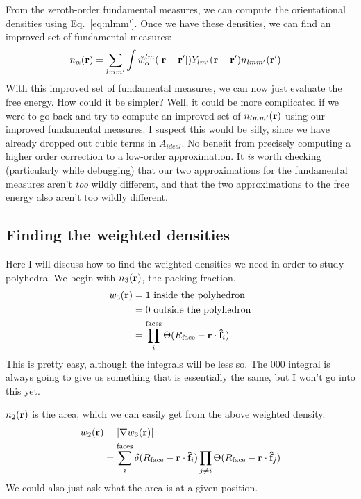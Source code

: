 \documentclass[letterpaper,twocolumn,amsmath,amssymb,pre]{revtex4-1}
\begin{document}
From the zeroth-order fundamental measures, we can
compute the orientational densities using Eq.~\ref{eq:nlmm'}.  Once we
have these densities, we can find an improved set of fundamental
measures:
\begin{align}
  n_\alpha(\mathbf{r}) &= \sum_{lmm'} \int
  \tilde{w}_\alpha^{lm}(|\mathbf{r}-\mathbf{r}'|) Y_{lm'}(\mathbf{r}-\mathbf{r}')n_{lmm'}(\mathbf{r}')
\end{align}
With this improved set of fundamental measures, we can now just
evaluate the free energy.  How could it be simpler? Well, it could be
more complicated if we were to go back and try to compute an improved
set of $n_{lmm'}(\mathbf{r})$ using our improved fundamental measures.  I
suspect this would be silly, since we have already dropped out cubic
terms in $A_{\textit{ideal}}$.  No benefit from precisely computing a
higher order correction to a low-order approximation.  It \emph{is}
worth checking (particularly while debugging) that our two
approximations for the fundamental measures aren't \emph{too} wildly
different, and that the two approximations to the free energy also
aren't too wildly different.

\subsection{Finding the weighted densities}

\newcommand\xhat{\mathbf{\hat{x}}}
\newcommand\yhat{\mathbf{\hat{y}}}
\newcommand\zhat{\mathbf{\hat{z}}}
\newcommand\facehat{\mathbf{\hat{f}}}
\newcommand\Rface{\ensuremath{R_{\text{face}}}}
\newcommand\Rvertex{\ensuremath{R_{\text{vertex}}}}

Here I will discuss how to find the weighted densities we need in
order to study polyhedra.  We begin with $n_3(\mathbf{r})$, the packing
fraction.
\begin{align}
  w_3(\rr) &= 1 \text{ inside the polyhedron}\\
  &= 0 \text{ outside the polyhedron} \\
  &= \prod_i^{\text{faces}} \Theta(\Rface - \rr\cdot\facehat_i)
\end{align}
This is pretty easy, although the integrals will be less so.  The
$000$ integral is always going to give us something that is
essentially the same, but I won't go into this yet.

$n_2(\mathbf{r})$ is the area, which we can easily get from the above
weighted density.
\begin{align}
  w_2(\rr) &= |\nabla w_3(\rr)| \\
  &= \sum_i^{\text{faces}} \delta(\Rface-\rr\cdot\facehat_i)
  \prod_{j\ne i} \Theta(\Rface-\rr\cdot\facehat_j)
\end{align}
We could also just ask what the area is at a given position.
\end{document}
